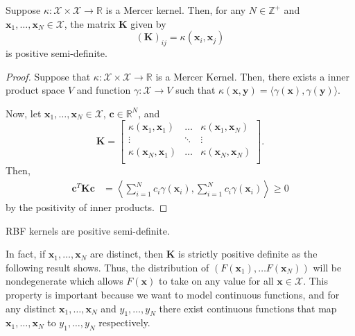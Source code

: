 \begin{lemma}
    Suppose $\kappa: \mathcal{X} \times \mathcal{X} \to \mathbb{R}$ is a Mercer kernel.
    Then, for any $N \in \mathbb{Z}^{+}$ and $\mathbf{x}_1, \ldots, \mathbf{x}_N \in \mathcal{X}$, the matrix $\mathbf{K}$
    given by
    \begin{equation*}
        (\mathbf{K})_{ij} = \kappa(\mathbf{x}_i, \mathbf{x}_j)
    \end{equation*}
    is positive semi-definite.
\end{lemma}
\begin{proof}
    Suppose that $\kappa: \mathcal{X} \times \mathcal{X} \to \mathbb{R}$ is a Mercer Kernel.
    Then, there exists a inner product space $V$ and function $\gamma: \mathcal{X} \to V$ such that $\kappa(\mathbf{x}, \mathbf{y}) = \langle\gamma(\mathbf{x}), \gamma(\mathbf{y})\rangle$.

    Now, let $\mathbf{x}_1, \dots, \mathbf{x}_N \in \mathcal{X}$, $\mathbf{c} \in \mathbb{R}^{N}$, and
    \begin{equation*}
        \mathbf{K} =
        \begin{bmatrix}
            \kappa(\mathbf{x}_1, \mathbf{x}_1) & \dots & \kappa(\mathbf{x}_1, \mathbf{x}_N) \\
            \vdots & \ddots & \vdots \\
            \kappa(\mathbf{x}_N, \mathbf{x}_1) & \dots & \kappa(\mathbf{x}_N, \mathbf{x}_N) \\
        \end{bmatrix}
        .
    \end{equation*}
    Then,
    \begin{align*}
        \mathbf{c}^{T} \mathbf{K} \mathbf{c}
        & = \left\langle \sum_{i = 1}^{N}c_i \gamma(\mathbf{x}_i),
        \sum_{i = 1}^{N}c_i \gamma(\mathbf{x}_i) \right\rangle
        \geq 0
    \end{align*}
    by the positivity of inner products.
\end{proof}

\begin{corollary}
    \label{corr:rbf-psd}
    RBF kernels are positive semi-definite.
\end{corollary}

In fact, if $\mathbf{x}_1, \dots, \mathbf{x}_N$ are distinct, then $\mathbf{K}$ is strictly positive definite as the following result shows.
Thus, the distribution of $(F(\mathbf{x}_1), \dots F(\mathbf{x}_N))$ will be nondegenerate which allows $F(\mathbf{x})$ to take on any value for all $\mathbf{x} \in \mathcal{X}$.
This property is important because we want to model continuous functions, and for any distinct $\mathbf{x}_1, \dots, \mathbf{x}_N$ and $y_1, \dots, y_N$ there exist continuous functions that map $\mathbf{x}_1, \dots, \mathbf{x}_N$ to $y_1, \dots, y_N$ respectively.

